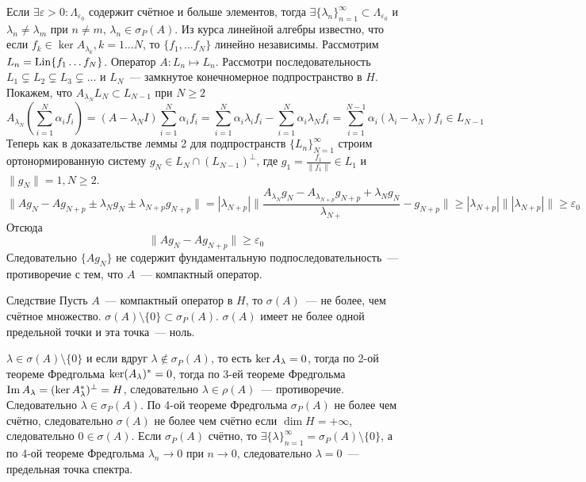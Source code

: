 \documentclass[14pt]{extarticle}
\begin{document}
\begin{Proof}
    Если $\exists \varepsilon > 0\colon \Lambda_{\varepsilon_0}$ содержит 
    счётное и больше элементов, тогда $\exists \{\lambda_n\}_{n = 1}^\infty
    \subset \Lambda_{\varepsilon_0}$ и $\lambda_n \ne \lambda_m$ при
    $n \ne m$, $\lambda_n \in \sigma_P(A)$.
    Из курса линейной алгебры известно, что если $f_k \in \ker A_{\lambda_k},
    k=1\dots N$, то $\{f_1,\dots f_N\}$ линейно независимы.
    Рассмотрим $L_n = \operatorname{Lin}\{f_1 \dots f_N\}$.
    Оператор $A : L_n \mapsto L_n$.
    Рассмотри последовательность $L_1 \varsubsetneq L_2 \varsubsetneq L_3
    \varsubsetneq \dots$ и $L_N$~--- замкнутое конечномерное подпространство
    в $H$.
    Покажем, что $A_{\lambda_N}L_N \subset L_{N - 1}$ при $N \ge 2$
    $$
    A_{\lambda_N} (\sum\limits_{i = 1}^N \alpha_i f_i) = (A - \lambda_N I)
    \sum\limits_{i = 1}^N \alpha_i f_i = \sum\limits_{i = 1}^N
    \alpha_i \lambda_i f_i - \sum\limits_{i = 1}^N \alpha_i \lambda_N f_i =
    \sum\limits_{i = 1}^{N - 1} \alpha_i (\lambda_i - \lambda_N) f_i \in 
    L_{N - 1}
    $$
    Теперь как в доказательстве леммы 2 для подпространств $\{L_n\}_{N = 1}^
    \infty$ строим ортонормированную систему $g_N \in L_N \cap (L_{N - 1})^
    \perp$, где $g_1 = \frac{f_1}{\|f_1\|} \in L_1$ и $\|g_N\| = 1, N \ge 2$.
    $$
    \|A g_N - A g_{N + p} \pm \lambda_N g_N \pm \lambda_{N + p} g_{N + p}\| =
    |\lambda_{N + p}|\|\frac{A_{\lambda_N}g_N - A_{\lambda_{N + p}}g_{N + p} +
    \lambda_N g_N}{\lambda_{N +}} - g_{N + p}\| \ge |\lambda_{N + p}|\||
    \lambda_{N + p}|\| \ge \varepsilon_0
    $$
    Отсюда
    $$
    \|A g_N - A g_{N + p}\| \ge \varepsilon_0
    $$
    Следовательно $\{A g_N\}$ не содержит фундаментальную 
    подпоследовательность~--- противоречие с тем, что $A$~--- компактный
    оператор.
\end{Proof}
\begin{MathCl}{Следствие}
    Пусть $A$~--- компактный оператор в $H$, то $\sigma(A)$~--- не более, 
    чем счётное множество.
    $\sigma(A) \setminus \{0\} \subset \sigma_P(A)$.
    $\sigma(A)$ имеет не более одной предельной точки и эта точка~--- ноль.
\end{MathCl}
\begin{Proof}
    $\lambda \in \sigma(A)\setminus\{0\}$ и если вдруг $\lambda \notin
    \sigma_P(A)$, то есть $\ker A_\lambda = 0$, тогда по 2-ой теореме Фредгольма
    $\ker(A_\lambda)^* = 0$, тогда по 3-ей теореме Фредгольма $\operatorname{Im} A_\lambda = (\ker
    A_\lambda^*)^\perp = H$, следовательно $\lambda \in \rho(A)$~--- противоречие.
    Следовательно $\lambda \in \sigma_P(A)$.
    По 4-ой теореме Фредгольма $\sigma_P(A)$ не более чем счётно,
    следовательно $\sigma(A)$ не более чем счётно если $\dim H = +\infty$,
    следовательно $0 \in \sigma(A)$.
    Если $\sigma_P(A)$ счётно, то $\exists \{\lambda\}_{n = 1}^\infty = 
    \sigma_P(A) \setminus\{0\}$, а по 4-ой теореме Фредгольма $\lambda_n \to 0
    $ при $n \to 0$, следовательно $\lambda = 0$~--- предельная точка спектра.
\end{Proof}
\end{document}

